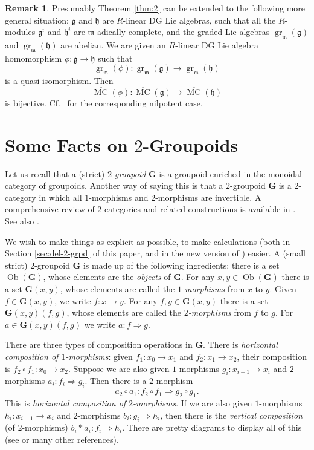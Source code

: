 \documentclass[a4paper,10pt]{amsart}
\theoremstyle{definition}
\newtheorem{rem}[equation]{Remark}
\numberwithin{equation}{section}
\newcommand{\opn}{\operatorname}
\newcommand{\ol}{\overline}
\newcommand{\mfrak}[1]{\mathfrak{#1}}
\newcommand{\bsym}[1]{\boldsymbol{#1}}
\newcommand{\g}{\mfrak{g}}
\newcommand{\m}{\mfrak{m}}
\newcommand{\h}{\mfrak{h}}
\newcommand{\twoto}{\Rightarrow}
\newcommand{\lb}{\linebreak}
\begin{document}
\begin{rem} \label{rem:11}
Presumably Theorem \ref{thm:2} can be extended to the following more general
situation: $\g$ and $\h$ are $R$-linear DG Lie algebras, such that all the
$R$-modules $\g^i$ and $\h^i$ are $\m$-adically complete, and the graded Lie
algebras $\opn{gr}_{\m} (\g)$ and $\opn{gr}_{\m} (\h)$ are abelian. 
We are given an $R$-linear DG Lie algebra homomorphism 
$\phi : \g \to \h$ such that 
\[ \opn{gr}_{\m}(\phi) : \opn{gr}_{\m} (\g) \to \opn{gr}_{\m} (\h) \]
is a quasi-isomorphism. Then 
\[ \ol{\opn{MC}}(\phi) : \ol{\opn{MC}}(\g) \to \ol{\opn{MC}}(\h) \]
is bijective. Cf.\ \cite[Theorem 2.1]{Ge} for the corresponding nilpotent case.
\end{rem}








\section{Some Facts on $2$-Groupoids}
\label{sec:2-grpd}

Let us recall that a (strict) {\em $2$-groupoid} $\bsym{G}$ is a groupoid
enriched in the monoidal category of groupoids. Another way of saying this is
that a $2$-groupoid $\bsym{G}$ is a $2$-category in which all $1$-morphisms and
$2$-morphisms are invertible. A comprehensive review of $2$-categories and
related constructions is available in \cite[Section 1]{Ye3}. 
See also \cite{Ma, Bw, Ge}.

We wish to make things as explicit as possible, to make calculations
(both in Section \ref{sec:del-2-grpd} of this paper, and in the new
version of \cite{Ye4}) easier.
A (small strict) $2$-groupoid $\bsym{G}$ is made up of the following
ingredients: there
is a set $\opn{Ob}(\bsym{G})$, whose elements are the {\em objects}
of $\bsym{G}$. For any $x, y \in \opn{Ob}(\bsym{G})$ there is a set 
$\bsym{G}(x, y)$, whose elements are called the {\em $1$-morphisms} from $x$
to $y$. Given $f \in \bsym{G}(x, y)$, we write $f : x \to y$. 
For any $f, g \in \bsym{G}(x, y)$ there is a set 
$\bsym{G}(x, y)(f, g)$, whose elements are called the {\em $2$-morphisms} from
$f$ to $g$. For $a \in \bsym{G}(x, y)(f, g)$ we write 
$a : f \twoto g$. 

There are three types of composition operations in $\bsym{G}$. There is {\em
horizontal composition of $1$-morphisms}: given $f_1 : x_0 \to x_1$ and 
$f_2 : x_1 \to x_2$, their composition is
$f_2 \circ f_1 : x_0 \to x_2$. Suppose we are also given $1$-morphisms 
$g_i : x_{i-1} \to x_i$ and $2$-morphisms $a_i : f_i \twoto g_i$. Then there is
a $2$-morphism 
\[ a_2 \circ a_1 : f_2 \circ f_1 \twoto g_2 \circ g_1 . \]
This is {\em horizontal composition of $2$-morphisms}. 
If we are also given \lb $1$-morphisms 
$h_i : x_{i-1} \to x_i$ and $2$-morphisms $b_i : g_i \twoto h_i$,
then there is the {\em vertical composition} (of $2$-morphisms) 
$b_i \ast a_i : f_i \twoto h_i$. 
There are pretty diagrams to display all of this (see \cite[Section 1]{Ye3} or
many other references). 
\end{document}
